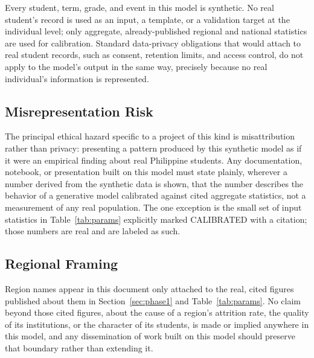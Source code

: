 \documentclass[11pt]{article}
\begin{document}
Every student, term, grade, and event in this model is synthetic. No real student's record is used as an input, a template, or a validation target at the individual level; only aggregate, already-published regional and national statistics are used for calibration. Standard data-privacy obligations that would attach to real student records, such as consent, retention limits, and access control, do not apply to the model's output in the same way, precisely because no real individual's information is represented.

\subsection{Misrepresentation Risk}
\label{sec:ethics-B}

The principal ethical hazard specific to a project of this kind is misattribution rather than privacy: presenting a pattern produced by this synthetic model as if it were an empirical finding about real Philippine students. Any documentation, notebook, or presentation built on this model must state plainly, wherever a number derived from the synthetic data is shown, that the number describes the behavior of a generative model calibrated against cited aggregate statistics, not a measurement of any real population. The one exception is the small set of input statistics in Table~\ref{tab:params} explicitly marked CALIBRATED with a citation; those numbers are real and are labeled as such.

\subsection{Regional Framing}
\label{sec:ethics-C}

Region names appear in this document only attached to the real, cited figures published about them in Section~\ref{sec:phase1} and Table~\ref{tab:params}. No claim beyond those cited figures, about the cause of a region's attrition rate, the quality of its institutions, or the character of its students, is made or implied anywhere in this model, and any dissemination of work built on this model should preserve that boundary rather than extending it.
\end{document}
